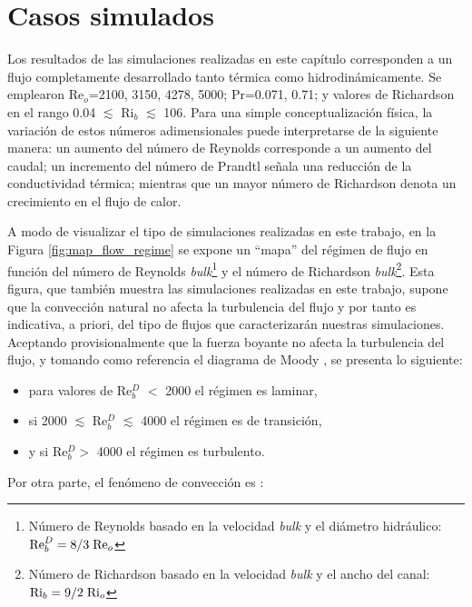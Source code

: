 \newpage

\section{Casos simulados} 

Los resultados de las simulaciones realizadas en este capítulo corresponden a un flujo completamente desarrollado tanto térmica como hidrodinámicamente. Se emplearon Re$_o$=2100, 3150, 4278, 5000; Pr=0.071, 0.71; y valores de Richardson en el rango 0.04 $\lesssim$ Ri$_b$ $\lesssim$ 106. Para una simple conceptualización física, la variación de estos números adimensionales puede interpretarse de la siguiente manera: un aumento del número de Reynolds corresponde a un aumento del caudal; un incremento del número de Prandtl señala una reducción de la conductividad térmica; mientras que un mayor número de Richardson denota un crecimiento en el flujo de calor.

A modo de visualizar el tipo de simulaciones realizadas en este trabajo, en la Figura \ref{fig:map_flow_regime} se expone un ``mapa''  del régimen de flujo en función del número de Reynolds \textit{bulk}\footnote{Número de Reynolds basado en la velocidad \textit{bulk} y el diámetro hidráulico: $\text{Re}^D_b = 8/3 \hspace*{1mm} \text{Re}_o$} y el número de Richardson \textit{bulk}\footnote{Número de Richardson basado en la velocidad \textit{bulk} y el ancho del canal: $\text{Ri}_b = 9/2 \hspace*{1mm} \text{Ri}_o$}. Esta figura, que también muestra las simulaciones realizadas en este trabajo, supone que la convección natural no afecta la turbulencia del flujo y por tanto es indicativa, a priori, del tipo de flujos que caracterizarán nuestras simulaciones. Aceptando provisionalmente que la fuerza boyante no afecta la turbulencia del flujo, y tomando como referencia el diagrama de Moody \cite{white}, se presenta lo siguiente:



\begin{itemize}
	\item para valores de Re$^D_b$ $<$ 2000 el régimen es laminar,
	\item si 2000 $\lesssim$ Re$^D_b$ $\lesssim$ 4000 el régimen es de transición,
	\item y si Re$^D_b>$ 4000 el régimen es turbulento.
\end{itemize}
Por otra parte, el fenómeno de convección es \cite{incropera,cengelheat}:

